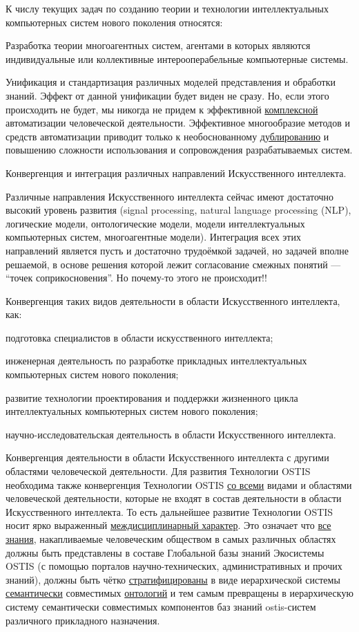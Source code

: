 К числу текущих задач по созданию теории и технологии интеллектуальных компьютерных систем нового поколения относятся:
\begin{textitemize}
	\item Разработка теории многоагентных систем, агентами в которых являются индивидуальные или коллективные интерооперабельные компьютерные системы.
	\item Унификация и стандартизация различных моделей представления и обработки знаний. Эффект от данной унификации будет виден не сразу. Но, если этого происходить не будет, мы никогда не придем к эффективной \uline{комплексной} автоматизации человеческой деятельности. Эффективное многообразие методов и средств автоматизации приводит только к необоснованному \uline{дублированию} и повышению сложности использования и сопровождения разрабатываемых систем.
	\item Конвергенция и интеграция различных направлений Искусственного интеллекта.
	\item Различные направления Искусственного интеллекта сейчас имеют достаточно высокий уровень развития (signal processing, natural language processing (NLP), логические модели, онтологические модели, модели интеллектуальных компьютерных систем, многоагентные модели). Интеграция всех этих направлений является пусть и достаточно трудоёмкой задачей, но задачей вполне решаемой, в основе решения которой лежит согласование смежных понятий --- ``точек соприкосновения''. Но почему-то этого не происходит!!
	\item Конвергенция таких видов деятельности в области Искусственного интеллекта, как:
	\begin{textitemize}
		\item подготовка специалистов в области искусственного интеллекта;
		\item инженерная деятельность по разработке прикладных интеллектуальных компьютерных систем нового поколения;
		\item развитие технологии проектирования и поддержки жизненного цикла интеллектуальных компьютерных систем нового поколения;
		\item научно-исследовательская деятельность в области Искусственного интеллекта.
	\end{textitemize}
	\item Конвергенция деятельности в области Искусственного интеллекта с другими областями человеческой деятельности. Для развития Технологии OSTIS необходима также конвергенция Технологии OSTIS \uline{со всеми} видами и областями человеческой деятельности, которые не входят в состав деятельности в области Искусственного интеллекта. То есть дальнейшее развитие Технологии OSTIS носит ярко выраженный \uline{междисциплинарный характер}. Это означает что \uline{все знания}, накапливаемые человеческим обществом в самых различных областях должны быть представлены в составе Глобальной базы знаний Экосистемы OSTIS (с помощью порталов научно-технических, административных и прочих знаний), должны быть чётко \uline{стратифицированы} в виде иерархической системы \uline{семантически} совместимых \uline{онтологий} и тем самым превращены в иерархическую систему семантически совместимых компонентов баз знаний ostis-систем различного прикладного назначения.

\end{textitemize}

